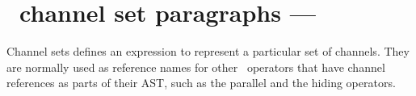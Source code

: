 \documentclass{article}
\begin{document}
%
%
%
%

\section{\Circus\ channel set paragraphs --- }

Channel sets defines an expression to represent a particular set of channels.
They are normally used as reference names for other \Circus\ operators that
have channel references as parts of their AST, such as the parallel and the
hiding operators.
\end{document}
